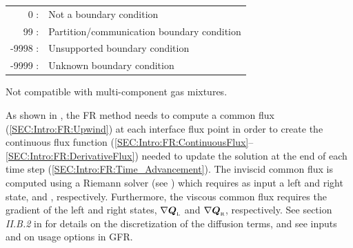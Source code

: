 \begin{table}[h!]
\begin{threeparttable}
\begin{tabular}{ @{\quad} r @{\quad} p{} @{} }
      0 : & Not a boundary condition\\
     99 : & Partition\slash communication boundary condition \\
  -9998 : & Unsupported boundary condition\\
  -9999 : & Unknown boundary condition\\
  \bottomrule
\end{tabular}
  \begin{tablenotes}
    \item[\ensuremath{\ast}] Not compatible with multi-component gas mixtures.
  \end{tablenotes}
\end{threeparttable}
\end{table}


As shown in , the FR method needs to compute a common flux
(\ref{SEC:Intro:FR:Upwind}) at each interface flux point in order to create the
continuous flux function
(\ref{SEC:Intro:FR:ContinuousFlux}--\ref{SEC:Intro:FR:DerivativeFlux}) needed to
update the solution at the end of each time step
(\ref{SEC:Intro:FR:Time_Advancement}).
%
The inviscid common flux is computed using a Riemann solver (see
) which requires as input a
left and right state, \cvVecL{} and \cvVecR, respectively.
%
Furthermore, the viscous common flux requires the gradient of the left and right
states, $\nabla \cvVecL$ and $\nabla \cvVecR$, respectively.
%
See section \textit{II.B.2} in  for details on the
discretization of the diffusion terms, and see inputs
 and
on usage options in GFR.


